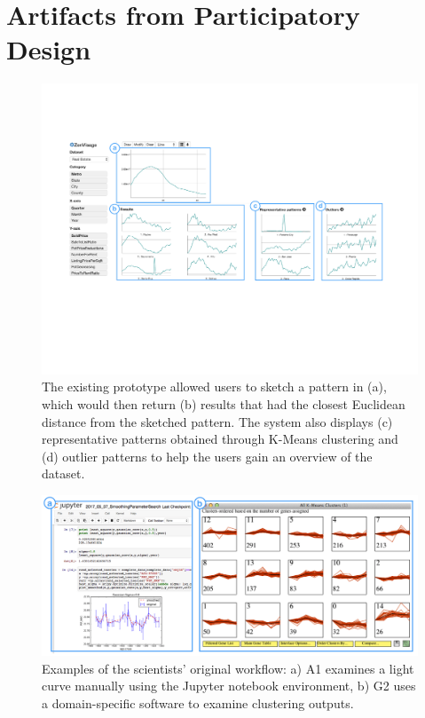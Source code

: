 \appendix
\section{Artifacts from Participatory Design\label{apdx:pdartifact}}
\begin{figure}[h!]
	\centering
	\includegraphics[width=\linewidth]{figures/oldZV_nozql.pdf}
	\caption{The existing \zv prototype allowed users to sketch a pattern in (a), which would then return (b) results that had the closest Euclidean distance from the sketched pattern. The system also displays (c) representative patterns obtained through K-Means clustering and (d) outlier patterns to help the users gain an overview of the dataset.}
	\label{oldZV}
\end{figure}
\begin{figure}[h!]
  \centering
  \includegraphics[width=\linewidth]{figures/workflow.png}
  \caption{Examples of the scientists' original workflow: a) A1 examines a light curve manually using the Jupyter notebook environment, b) G2 uses a domain-specific software to examine clustering outputs.}
  \label{workflow}
\end{figure}
